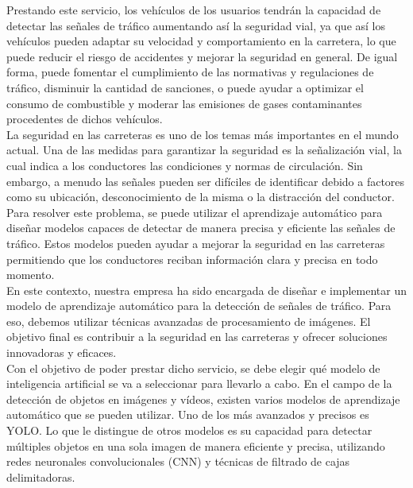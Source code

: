 Prestando este servicio, los vehículos de los usuarios tendrán la capacidad de detectar las señales de tráfico aumentando así la seguridad vial, ya que así los vehículos pueden adaptar su velocidad y comportamiento en la carretera, lo que puede reducir el riesgo de accidentes y mejorar la seguridad en general. De igual forma, puede fomentar el cumplimiento de las normativas y regulaciones de tráfico, disminuir la cantidad de sanciones, o puede ayudar a optimizar el consumo de combustible y moderar las emisiones de gases contaminantes procedentes de dichos vehículos.\\

La seguridad en las carreteras es uno de los temas más importantes en el mundo actual. Una de las medidas para garantizar la seguridad es la señalización vial, la cual indica a los conductores las condiciones y normas de circulación. Sin embargo, a menudo las señales pueden ser difíciles de identificar debido a factores como su ubicación, desconocimiento de la misma o la distracción del conductor.\\

Para resolver este problema, se puede utilizar el aprendizaje automático para diseñar modelos capaces de detectar de manera precisa y eficiente las señales de tráfico. Estos modelos pueden ayudar a mejorar la seguridad en las carreteras permitiendo que los conductores reciban información clara y precisa en todo momento.\\

En este contexto, nuestra empresa ha sido encargada de diseñar e implementar un modelo de aprendizaje automático para la detección de señales de tráfico. Para eso, debemos utilizar técnicas avanzadas de procesamiento de imágenes. El objetivo final es contribuir a la seguridad en las carreteras y ofrecer soluciones innovadoras y eficaces.\\

Con el objetivo de poder prestar dicho servicio, se debe elegir qué modelo de inteligencia artificial se va a seleccionar para llevarlo a cabo. En el campo de la detección de objetos en imágenes y vídeos, existen varios modelos de aprendizaje automático que se pueden utilizar. Uno de los más avanzados y precisos es YOLO. Lo que le distingue de otros modelos es su capacidad para detectar múltiples objetos en una sola imagen de manera eficiente y precisa, utilizando redes neuronales convolucionales (CNN) y técnicas de filtrado de cajas delimitadoras. \\


